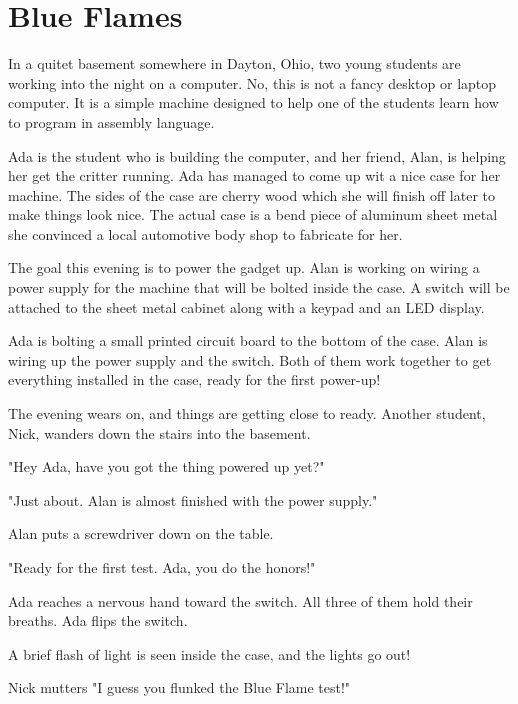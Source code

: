 \documentclass[../main.tex]{subfiles}
\begin{document}
\chapter{Blue Flames}

In a quitet basement somewhere in Dayton, Ohio, two young students are working
into the night on a computer. No, this is not a fancy desktop or laptop
computer. It is a simple machine designed to help one of the students learn how
to program in assembly language.

Ada is the student who is building the computer, and her friend, Alan, is
helping her get the critter running. Ada has managed to come up wit a nice case
for her machine. The sides of the case are cherry wood which she will finish
off later to make things look nice. The actual case is a bend piece of aluminum
sheet metal she convinced a local automotive body shop to fabricate for her.

The goal this evening is to power the gadget up. Alan is working on wiring a
power supply for the machine that will be bolted inside the case. A switch will
be attached to the sheet metal cabinet along with a keypad and an LED display. 

Ada is bolting a small printed circuit board to the bottom of the case. Alan is
wiring up the power supply and the switch. Both of them work together to get
everything installed in the case, ready for the first power-up!

The evening wears on, and things are getting close to ready. Another student,
Nick, wanders down the stairs into the basement.

"Hey Ada, have you got the thing powered up yet?"

"Just about. Alan is almost finished with the power supply."

Alan puts a screwdriver down on the table.

"Ready for the first test. Ada, you do the honors!"

Ada reaches a nervous hand toward the switch. All three of them hold their
breaths. Ada flips the switch.

A brief flash of light is seen inside the case, and the lights go out!

Nick mutters "I guess you flunked the Blue Flame test!"
\end{document}
